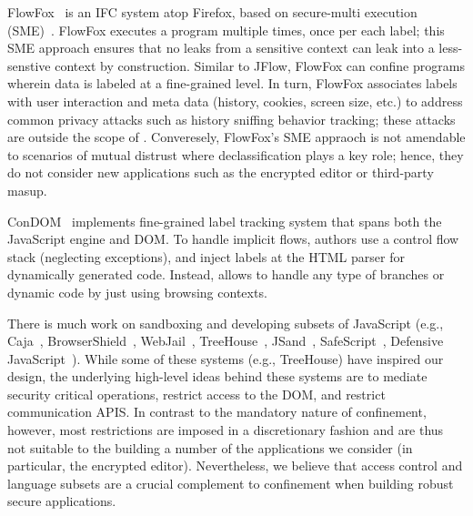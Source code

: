 FlowFox~\cite{DeGroef:2012} is an IFC system atop Firefox, based on
secure-multi execution (SME)~\cite{Devriese:2010}.
%
FlowFox executes a program multiple times, once per each label; this
SME approach ensures that no leaks from a sensitive context can leak
into a less-senstive context by construction.
%
Similar to JFlow, FlowFox can confine programs wherein data is labeled
at a fine-grained level.
%
In turn, FlowFox associates labels with user interaction and meta data
(history, cookies, screen size, etc.) to address common privacy
attacks such as history sniffing behavior tracking; these attacks are
outside the scope of \sys{}.
%
Converesely, FlowFox's SME appraoch is not amendable to scenarios of
mutual distrust where declassification plays a key role; hence, they
do not consider new applications such as the encrypted editor or
third-party masup.

%

ConDOM~\cite{ConDOM} implements fine-grained label tracking system
that spans both the JavaScript engine and DOM.
%
To handle implicit flows, authors use a
control flow stack (neglecting exceptions), and inject labels at the HTML parser
for dynamically generated code. Instead, \sys{} allows to handle any type of
branches or dynamic code by just using browsing contexts.


There is much work on sandboxing and developing subsets of JavaScript (e.g.,
Caja~\cite{GoogleCaja}, BrowserShield~\cite{Reis:2007},
WebJail~\cite{VanAcker:2011}, TreeHouse~\cite{Ingram:2012},
JSand~\cite{Agten:2012:JCC}, SafeScript~\cite{SafeScript}, Defensive
JavaScript~\cite{djs}). 
%
While some of these systems (e.g., TreeHouse) have inspired our design, the
underlying high-level ideas behind these systems are to mediate security
critical operations, restrict access to the DOM, and restrict communication APIS.
%
In contrast to the mandatory nature of confinement, however, most restrictions
are imposed in a discretionary fashion and are thus not suitable to the
building a number of the applications we consider (in particular, the encrypted
editor).
%
Nevertheless, we believe that access control and language subsets are a crucial
complement to confinement when building robust secure applications.



